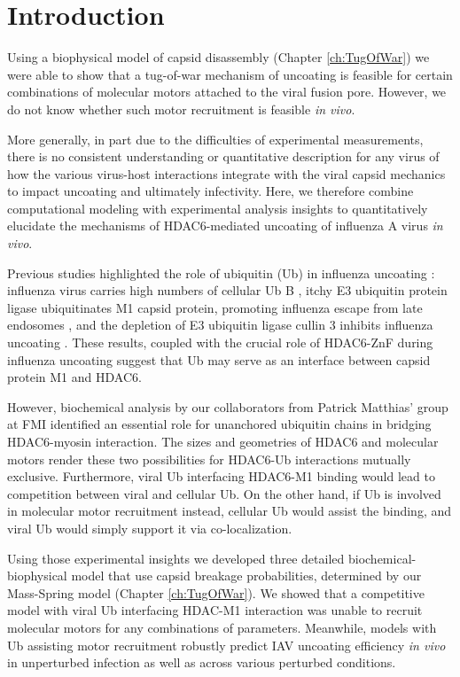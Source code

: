 \section{Introduction}

Using a biophysical model of capsid disassembly (Chapter \ref{ch:TugOfWar}) we were able to show that a tug-of-war mechanism of uncoating is feasible for certain combinations of molecular motors attached to the viral fusion pore. However, we do not know whether such motor recruitment is feasible \textit{in vivo}.

More generally, in part due to the difficulties of experimental measurements, there is no consistent understanding or quantitative description for any virus of how the various virus-host interactions integrate with the viral capsid mechanics to impact uncoating and ultimately infectivity. Here, we therefore combine computational modeling with experimental analysis insights to quantitatively elucidate the mechanisms of HDAC6-mediated uncoating of influenza A virus \textit{in vivo}. 

Previous studies highlighted the role of ubiquitin (Ub) in influenza uncoating \cite{rudnicka2016ubiquitin}: influenza virus carries high numbers of cellular Ub B \cite{hutchinson2014conserved}, itchy E3 ubiquitin protein ligase ubiquitinates M1 capsid protein, promoting influenza escape from late endosomes \cite{su2013pooled}, and the depletion of E3 ubiquitin ligase cullin 3 inhibits influenza uncoating \cite{hubner2012cullin, huotari2012cullin}. These results, coupled with the crucial role of HDAC6-ZnF during influenza uncoating \cite{banerjee2014influenza} suggest that Ub may serve as an interface between capsid protein M1 and HDAC6.

However, biochemical analysis by our collaborators from Patrick Matthias' group at FMI identified an essential role for unanchored ubiquitin chains in bridging HDAC6-myosin interaction. The sizes and geometries of HDAC6 and molecular motors render these two possibilities for HDAC6-Ub interactions mutually exclusive. Furthermore, viral Ub interfacing HDAC6-M1 binding would lead to competition between viral and cellular Ub. On the other hand, if Ub is involved in molecular motor recruitment instead, cellular Ub would assist the binding, and viral Ub would simply support it via co-localization.

Using those experimental insights we developed three detailed biochemical-biophysical model that use capsid breakage probabilities, determined by our Mass-Spring model (Chapter \ref{ch:TugOfWar}). We showed that a competitive model with viral Ub interfacing HDAC-M1 interaction was unable to recruit molecular motors for any combinations of parameters. Meanwhile, models with Ub assisting motor recruitment robustly predict IAV uncoating efficiency \textit{in vivo} in unperturbed infection as well as across various perturbed conditions.

